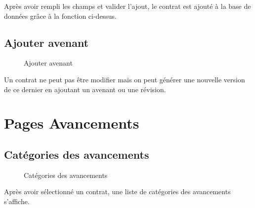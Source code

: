 \documentclass[a4paper]{report}
\begin{document}
Après avoir rempli les champs et valider l'ajout, le contrat est ajouté à la base de données grâce à la fonction ci-dessus.
\subsection{Ajouter avenant}
\begin{figure}[H]
	\begin{center}
		\caption{Ajouter avenant}
	\end{center}
\end{figure}
Un contrat ne peut pas être modifier mais on peut générer une nouvelle version de ce dernier en ajoutant un avenant ou une révision.
\section{Pages Avancements}
\subsection{Catégories des avancements}
\begin{figure}[H]
	\begin{center}
		\caption{Catégories des avancements}
	\end{center}
\end{figure}
Après avoir sélectionné un contrat, une liste de catégories des avancements s'affiche.
\end{document}
